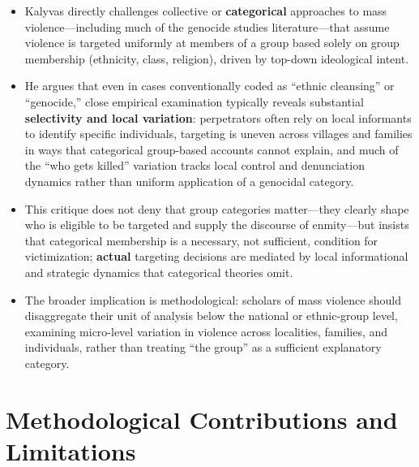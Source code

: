 \documentclass[12pt]{article}
\begin{document}
\begin{itemize}[leftmargin=*, itemsep=4pt]
    \item Kalyvas directly challenges collective or \textbf{categorical} approaches to mass violence---including much of the genocide studies literature---that assume violence is targeted uniformly at members of a group based solely on group membership (ethnicity, class, religion), driven by top-down ideological intent.
    \item He argues that even in cases conventionally coded as ``ethnic cleansing'' or ``genocide,'' close empirical examination typically reveals substantial \textbf{selectivity and local variation}: perpetrators often rely on local informants to identify specific individuals, targeting is uneven across villages and families in ways that categorical group-based accounts cannot explain, and much of the ``who gets killed'' variation tracks local control and denunciation dynamics rather than uniform application of a genocidal category.
    \item This critique does not deny that group categories matter---they clearly shape who is eligible to be targeted and supply the discourse of enmity---but insists that categorical membership is a necessary, not sufficient, condition for victimization; \textbf{actual} targeting decisions are mediated by local informational and strategic dynamics that categorical theories omit.
    \item The broader implication is methodological: scholars of mass violence should disaggregate their unit of analysis below the national or ethnic-group level, examining micro-level variation in violence across localities, families, and individuals, rather than treating ``the group'' as a sufficient explanatory category.
\end{itemize}

\section{Methodological Contributions and Limitations}
\end{document}
